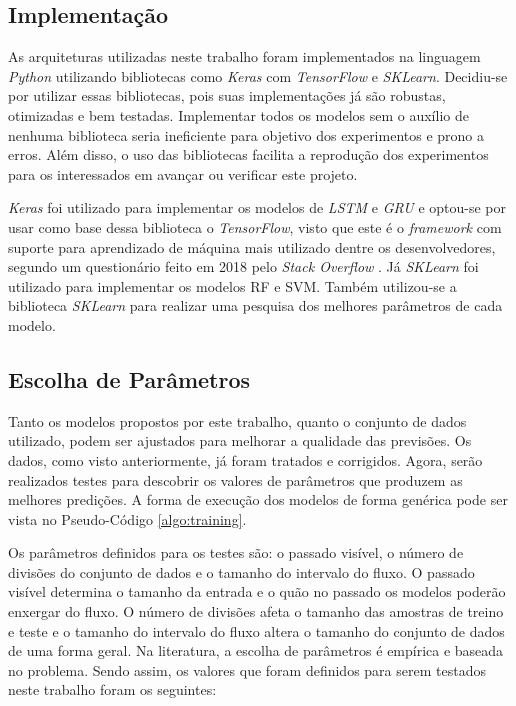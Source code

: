 \subsection{Implementação}

As arquiteturas utilizadas neste trabalho foram implementados na linguagem \textit{Python} utilizando bibliotecas como \textit{Keras} com \textit{TensorFlow} e \textit{SKLearn}. Decidiu-se por utilizar essas bibliotecas, pois suas implementações já são robustas, otimizadas e bem testadas. Implementar todos os modelos sem o auxílio de nenhuma biblioteca seria ineficiente para objetivo dos experimentos e prono a erros. Além disso, o uso das bibliotecas facilita a reprodução dos experimentos para os interessados em avançar ou verificar este projeto.

\textit{Keras} foi utilizado para implementar os modelos de \textit{\acrshort{LSTM}} e \textit{\acrshort{GRU}} e optou-se por usar como base dessa biblioteca o \textit{TensorFlow}, visto que este é o \textit{framework} com suporte para aprendizado de máquina mais utilizado dentre os desenvolvedores, segundo um questionário feito em 2018 pelo \textit{Stack Overflow} \cite{stack_2018}. Já \textit{SKLearn} foi utilizado para implementar os modelos \acrshort{RF} e \acrshort{SVM}. Também utilizou-se a biblioteca \textit {SKLearn} para realizar uma pesquisa dos melhores parâmetros de cada modelo.

\subsection{Escolha de Parâmetros}

Tanto os modelos propostos por este trabalho, quanto o conjunto de dados utilizado, podem ser ajustados para melhorar a qualidade das previsões. Os dados, como visto anteriormente, já foram tratados e corrigidos. Agora, serão realizados testes para descobrir os valores de parâmetros que produzem as melhores predições. A forma de execução dos modelos de forma genérica pode ser vista no Pseudo-Código \ref{algo:training}.

Os parâmetros definidos para os testes são: o passado visível, o número de divisões do conjunto de dados e o tamanho do intervalo do fluxo. O passado visível determina o tamanho da entrada e o quão no passado os modelos poderão enxergar do fluxo. O número de divisões afeta o tamanho das amostras de treino e teste e o tamanho do intervalo do fluxo altera o tamanho do conjunto de dados de uma forma geral. Na literatura, a escolha de parâmetros é empírica e baseada no problema. Sendo assim, os valores que foram definidos para serem testados neste trabalho foram os seguintes:

